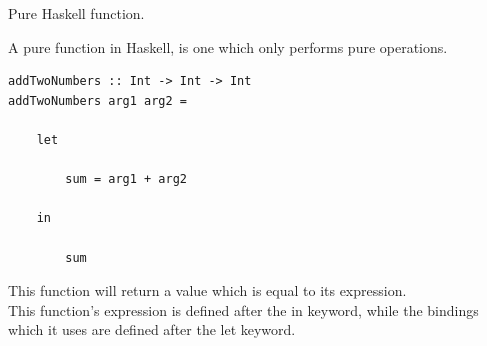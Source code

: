 \begin{frame}[t, fragile]{Pure Haskell function.}

A pure function in Haskell, is one which only performs pure operations.

\begin{verbatim}
addTwoNumbers :: Int -> Int -> Int
addTwoNumbers arg1 arg2 =

    let

        sum = arg1 + arg2

    in

        sum
\end{verbatim}

This function will return a value which is equal to its expression.\\

This function's expression is defined after the in keyword, while the
bindings which it uses are defined after the let keyword.

\end{frame}
